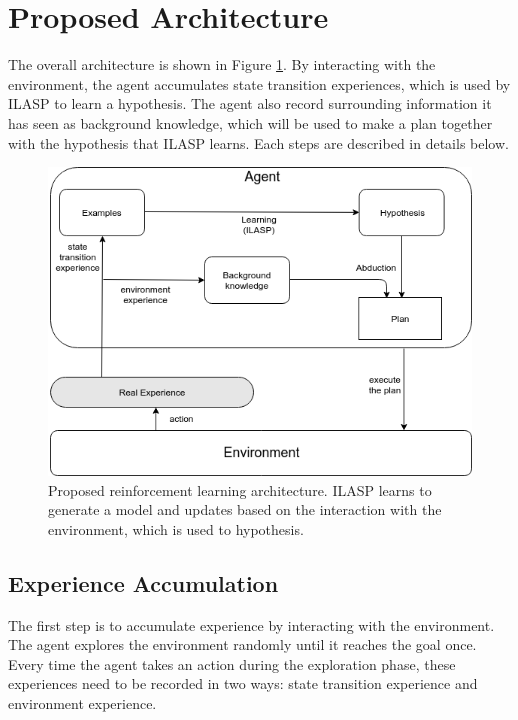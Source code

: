 \section{Proposed Architecture}
\label{proposed_architecture_section}

The overall architecture is shown in Figure \ref{proposed_architecture}. By interacting with the environment, the agent accumulates state transition experiences, which is used by ILASP to learn a hypothesis.
The agent also record surrounding information it has seen as background knowledge, which will be used to make a plan together with the hypothesis that ILASP learns. 
Each steps are described in details below. 

\begin{figure}[!htb]
\centering
\includegraphics[width=1.0\textwidth]{./figures/architecture}
\caption{Proposed reinforcement learning architecture. ILASP learns to generate a model and updates based on the interaction with the environment, which is used to hypothesis. }
\label{proposed_architecture}
\end{figure}

\subsection{Experience Accumulation}
\label{experience_accumulation}

The first step is to accumulate experience by interacting with the environment. The agent explores the environment randomly until it reaches the goal once. 
Every time the agent takes an action during the exploration phase, these experiences need to be recorded in two ways: state transition experience and environment experience.

